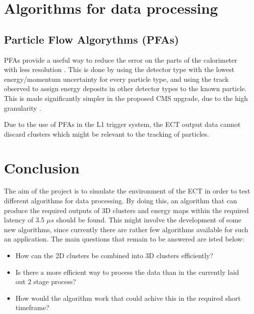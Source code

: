 \documentclass[12 pt]{article}
\begin{document}
	\section{Algorithms for data processing}
		\subsection{Particle Flow Algorythms (PFAs)}\label{PFAs}
			PFAs provide a useful way to reduce the error on the parts of the calorimeter with less resolution \cite{PFAsInHCAL} \cite{PFAsDualReadout}. This is done by using the detector type with the lowest energy/momentum uncertainty for every particle type, and using the track observed to assign energy deposits in other detector types to the known particle. This is made significantly simpler in the proposed CMS upgrade, due to the high granularity \cite{PFAsInHCAL}.

			Due to the use of PFAs in the L1 trigger system, the ECT output data cannot discard clusters which might be relevant to the tracking of particles. 

	\section{Conclusion}
		The aim of the project is to simulate the environment of the ECT in order to test different algorithms for data processing. By doing this, an algorithm that can produce the required outputs of 3D clusters and energy maps within the required latency of 3.5 $\mu s$ should be found. This might involve the development of some new algorithms, since currently there are rather few algorithms available for such an application. The main questions that remain to be answered are isted below:

		\begin{itemize}
			\item How can the 2D clusters be combined into 3D clusters efficiently?
			\item Is there a more efficient way to process the data than in the currently laid out 2 stage process?
			\item How would the algorithm work that could achive this in the required short timeframe?
		\end{itemize}

	
	{}
\end{document}
